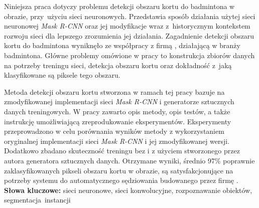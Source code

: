Niniejsza praca dotyczy problemu detekcji obszaru kortu do badmintona w obrazie, przy~użyciu sieci neuronowych.
Przedstawia sposób działania użytej sieci neuronowej \textit{Mask R-CNN} oraz jej modyfikacje wraz z~historycznym kontekstem rozwoju sieci dla lepszego zrozumienia jej działania.
Zagadnienie detekcji obszaru kortu do badmintona wyniknęło ze współpracy z firmą \blue{}, działającą w branży badmintona.
Główne problemy omówione w pracy to konstrukcja zbiorów danych na potrzeby treningu sieci, detekcja obszaru kortu oraz dokładność z~jaką klasyfikowane są piksele tego obszaru.

Metoda detekcji obszaru kortu stworzona w ramach tej pracy bazuje na zmodyfikowanej implementacji sieci \textit{Mask R-CNN} i generatorze sztucznych danych treningowych.
W pracy zawarto opis metody, opis testów, a także instrukcję umożliwiającą zreprodukowanie eksperymentów. Eksperymenty przeprowadzono w celu porównania wyników metody z wykorzystaniem oryginalnej implementacji sieci \textit{Mask R-CNN} i jej zmodyfikowanej wersji.
Dodatkowo zbadano skuteczność treningu bez i z użyciem stworzonego przez autora generatora sztucznych danych. Otrzymane wyniki, średnio 97\% poprawnie zaklasyfikowanych pikseli obszaru kortu w obrazie, są satysfakcjonujące na potrzeby systemu do automatycznego sędziowania budowanego przez firmę \blue{}.
\\

\noindent \textbf{Słowa kluczowe:} sieci neuronowe, sieci konwolucyjne, rozpoznawanie obiektów, segmentacja~instancji
